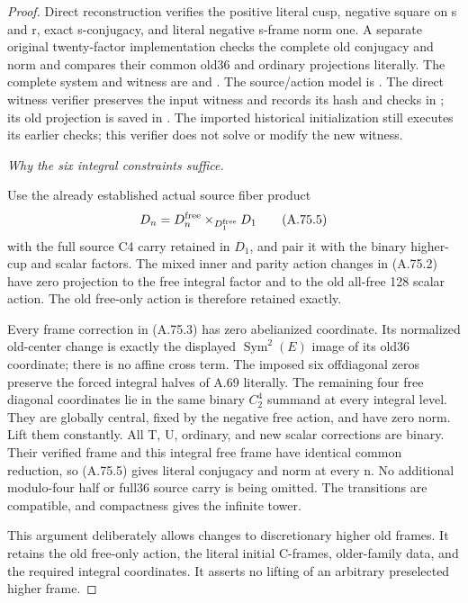 \begin{proof}
Direct reconstruction verifies the positive literal cusp, negative
square on s and r, exact s-conjugacy, and literal negative s-frame
norm one. A separate original twenty-factor implementation checks
the complete old conjugacy and norm and compares their common
old36 and ordinary projections literally. The complete system and
witness are
 and
.
The source/action model is
.
The direct witness verifier
preserves the input witness and records its hash and checks in
; its old projection
is saved in .
The imported historical initialization still executes its earlier
checks; this verifier does not solve or modify the new witness.

\emph{Why the six integral constraints suffice.}\par
Use the already established actual source fiber product
\[
 D_n=D_n^{\rm free}\mathbin{\times}_{D_1^{\rm free}}D_1
 \tag{A.75.5}
\]
with the full source C4 carry retained in \(D_1\), and pair it
with the binary higher-cup and scalar factors. The mixed inner
and parity action changes in (A.75.2) have zero projection to the
free integral factor and to the old all-free 128 scalar action.
The old free-only action is therefore retained exactly.

Every frame correction in (A.75.3) has zero abelianized coordinate.
Its normalized old-center change is exactly the displayed
\(\operatorname{Sym}^2(E)\) image of its old36 coordinate;
there is no affine cross term. The imposed six offdiagonal zeros
preserve the forced integral halves of A.69 literally. The remaining
four free diagonal coordinates lie in the same binary \(C_2^4\)
summand at every integral level. They are globally central, fixed
by the negative free action, and have zero norm. Lift them
constantly. All T, U, ordinary, and new scalar corrections are
binary. Their verified frame and this integral free frame have
identical common reduction, so (A.75.5) gives literal conjugacy
and norm at every n. No additional modulo-four half or full36
source carry is being omitted. The transitions are compatible,
and compactness gives the infinite tower.

This argument deliberately allows changes to discretionary higher
old frames. It retains the old free-only action, the literal
initial C-frames, older-family data, and the required integral
coordinates. It asserts no lifting of an arbitrary preselected
higher frame.


\end{proof}
